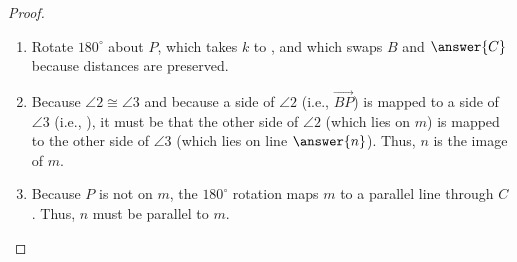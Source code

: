 \documentclass[nooutcomes]{ximera}
\begin{document}
\begin{problem}
\begin{proof}
\begin{enumerate}
\item Rotate $180^\circ$ about $P$, which takes $k$ to , and which swaps $B$ and $\answer{C}$ because distances are preserved.  
\item Because $\angle 2 \cong \angle 3$ and because a side of $\angle 2$ (i.e., $\overrightarrow{BP}$) is mapped to a side of $\angle 3$ (i.e., ), it must be that the other side of $\angle 2$ (which lies on $m$) is mapped to the other side of $\angle 3$ (which lies on line $\answer{n}$).  Thus, $n$ is the image of $m$.  
\item Because $P$ is not on $m$, the $180^\circ$ rotation maps $m$ to a parallel line through $C$.  Thus, $n$ must be parallel to $m$.  
\end{enumerate}
\end{proof}
\end{problem}
\end{document}
